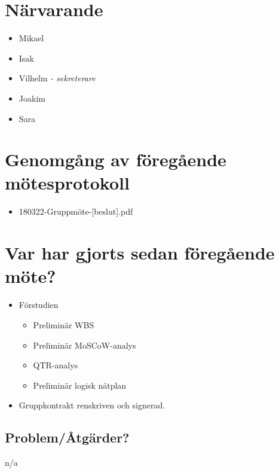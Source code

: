 
\section*{Närvarande}
\begin{itemize}[noitemsep]
    \item Mikael
    \item Isak
    \item Vilhelm \textit{- sekreterare}
    \item Joakim
    \item Sara
\end{itemize}

\section*{Genomgång av föregående mötesprotokoll}
\begin{itemize}[noitemsep]
    \item 180322-Gruppmöte-[beslut].pdf
\end{itemize}


\section*{Var har gjorts sedan föregående möte?}
\begin{itemize}[noitemsep]
    \item Förstudien
    \begin{itemize}[noitemsep]
        \item Preliminär WBS
        \item Preliminär MoSCoW-analys
        \item QTR-analys
        \item Preliminär logisk nätplan
    \end{itemize}
    \item Gruppkontrakt renskriven och signerad.
\end{itemize}

\subsection*{Problem/Åtgärder?}
n/a

